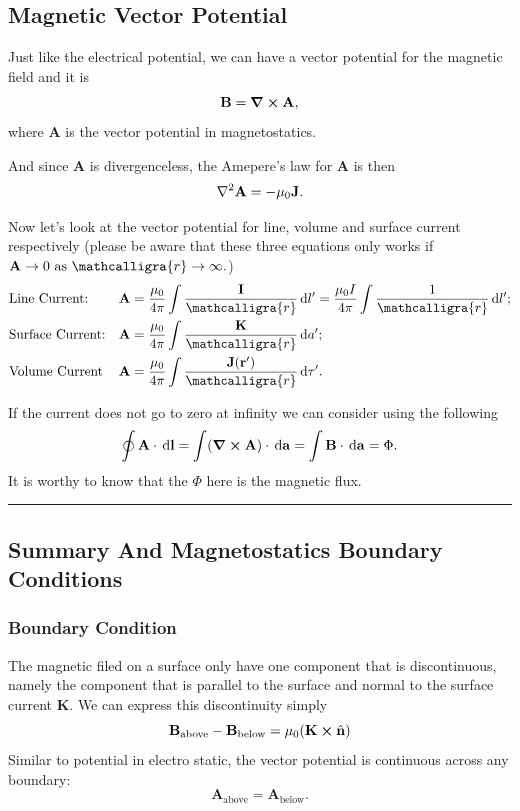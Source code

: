 \documentclass[12pt,english]{article}
\newcommand{\dmr}[1]{\, \mathrm{d}#1} %
\numberwithin{equation}{subsection}
\newcommand{\curly}[1]{\ensuremath{\mathcalligra{#1}}}
\let\oldhat\hat
\renewcommand{\vec}[1]{\mathbf{#1}}
\renewcommand{\hat}[1]{\oldhat{\mathbf{#1}}}
\begin{document}
\subsection{Magnetic Vector Potential}
Just like the electrical potential, we can have a vector potential for the magnetic field and it is 
\begin{equation}
    \vec{B} = \curl \vec{A},
\end{equation}
where $\vec{A}$ is the vector potential in magnetostatics.

And since $\vec{A}$ is divergenceless, the Amepere's law for $\vec{A}$ is then 
\begin{equation}
    \laplacian\vec{A} = - \mu_0 \vec{J}.
\end{equation}

Now let's look at the vector potential for line, volume and surface current respectively (please be aware that these three equations only works if $\vec{A} \to 0 \text{ as } \curly{r} \to \infty.$)
\begin{align}
    &\text{Line Current:} &&\vec{A} = \frac{\mu_0}{4 \pi} \int \frac{\vec{I}}{\curly{r}}\dmr{l'} = \frac{\mu_0 I }{4 \pi} \int \frac{1}{\curly{r}}\dmr{l'};\\
    &\text{Surface Current:} &&\vec{A} = \frac{\mu_0 }{4 \pi} \int \frac{\vec{K}}{\curly{r}}\dmr{a'};\\
    &\text{Volume Current} &&\vec{A} = \frac{\mu_0}{4 \pi}\int \frac{\vec{J}(\vec{r'})}{\curly{r}}\dmr{\tau'}.
\end{align}

If the current does not go to zero at infinity we can consider using the following
\begin{equation}
    \oint\vec{A}\cdot\dmr{\vec{l}} = \int (\curl \vec{A}) \cdot \dmr{\vec{a}} = \int \vec{B}\cdot \dmr{\vec{a}} = \Phi.
\end{equation}
It is worthy to know that the $\Phi$ here is the magnetic flux.

\par\noindent\rule{\textwidth}{0.4pt}
\subsection{Summary And Magnetostatics Boundary Conditions}
\subsubsection{Boundary Condition}
The magnetic filed on a surface only have one component that is discontinuous, namely the component that is parallel to the surface and normal to the surface current $\vec{K}$. We can express this discontinuity simply
\begin{equation}
    \vec{B}_{\text{above}} - \vec{B}_{\text{below}} = \mu_0(\vec{K}\cross \hat{n})
\end{equation}
Similar to potential in electro static, the vector potential is continuous across any boundary:
\begin{equation}
    \vec{A}_{\text{above}} = \vec{A}_{\text{below}}.
\end{equation}
\end{document}
